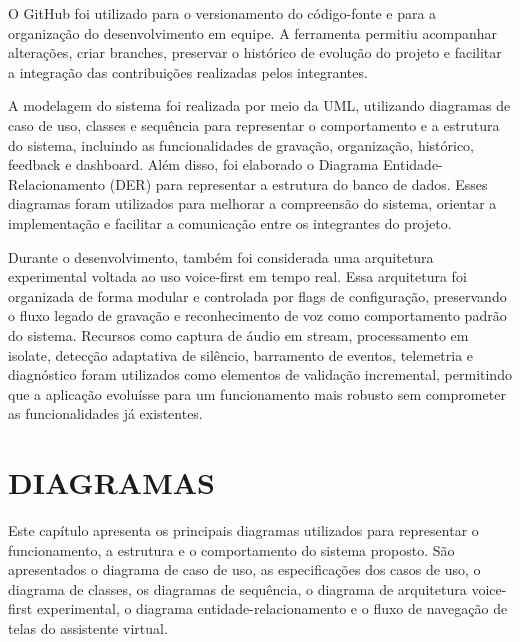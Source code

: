 \documentclass[12pt,oneside,a4paper,brazil,final]{abntex2}
\begin{document}
O GitHub foi utilizado para o versionamento do código-fonte e para a organização do desenvolvimento em equipe. A ferramenta permitiu acompanhar alterações, criar branches, preservar o histórico de evolução do projeto e facilitar a integração das contribuições realizadas pelos integrantes.

A modelagem do sistema foi realizada por meio da UML, utilizando diagramas de caso de uso, classes e sequência para representar o comportamento e a estrutura do sistema, incluindo as funcionalidades de gravação, organização, histórico, feedback e dashboard. Além disso, foi elaborado o Diagrama Entidade-Relacionamento (DER) para representar a estrutura do banco de dados. Esses diagramas foram utilizados para melhorar a compreensão do sistema, orientar a implementação e facilitar a comunicação entre os integrantes do projeto.

Durante o desenvolvimento, também foi considerada uma arquitetura experimental voltada ao uso voice-first em tempo real. Essa arquitetura foi organizada de forma modular e controlada por flags de configuração, preservando o fluxo legado de gravação e reconhecimento de voz como comportamento padrão do sistema. Recursos como captura de áudio em stream, processamento em isolate, detecção adaptativa de silêncio, barramento de eventos, telemetria e diagnóstico foram utilizados como elementos de validação incremental, permitindo que a aplicação evoluísse para um funcionamento mais robusto sem comprometer as funcionalidades já existentes.






\chapter{DIAGRAMAS}



Este capítulo apresenta os principais diagramas utilizados para representar o funcionamento, a estrutura e o comportamento do sistema proposto. São apresentados o diagrama de caso de uso, as especificações dos casos de uso, o diagrama de classes, os diagramas de sequência, o diagrama de arquitetura voice-first experimental, o diagrama entidade-relacionamento e o fluxo de navegação de telas do assistente virtual.
\end{document}
